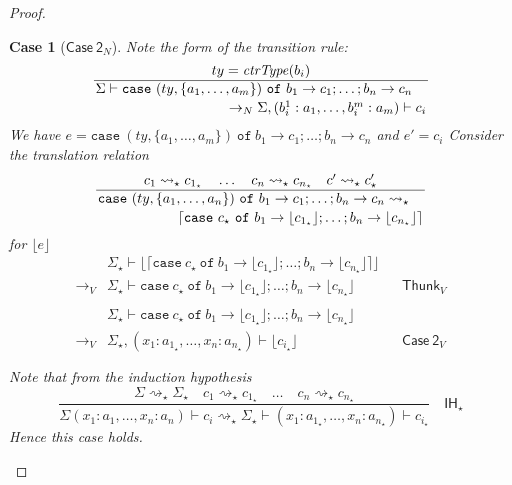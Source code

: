 \documentclass[float=false, crop=false]{standalone}
\newtheorem{case}{Case}
\numberwithin{subcase}{case}
\newcommand{\tlang}{\star}
\newcommand{\thunk}[1]{\lceil #1 \rceil}
\newcommand{\unwrap}[1]{\lfloor #1 \rfloor}
\newcommand{\tcbn}{\rightarrow_N}
\newcommand{\tcbv}{\rightarrow_V}
\newcommand{\tlthunk}{\rightsquigarrow_\tlang}
\begin{document}
\begin{proof}
\begin{case}[$\mathsf{Case\ 2}_N$]
  Note the form of the transition rule:
  \[ \dfrac{ty = \mathit{ctrType}(b_i)}{\splitdfrac{\Sigma \vdash 
  \mathtt{case}\ (ty,\{a_1,\dotsc,a_m\}) \ \mathtt{of}\ b_1 \rightarrow c_1; \dots; b_n \rightarrow c_n}
  {\tcbn \Sigma,(b_i^1:a_1,\dotsc,b_i^m:a_m) \vdash c_i}} \]
  We have $e = 
  \mathtt{case}\ (ty,\{a_1,\dotsc,a_m\}) \ \mathtt{of}\ b_1 \rightarrow c_1;
  \dots; b_n \rightarrow c_n$ and
  $e' = c_i$
  Consider the translation relation
  \[ \dfrac{c_1  \tlthunk c_{1_\tlang} \quad \dots \quad c_n \tlthunk c_{n_\tlang} 
      \quad c' \tlthunk c'_\tlang}
  {\splitdfrac{\mathtt{case}\ (ty,\{a_1,\dotsc,a_n\})\ \mathtt{of}\ 
      b_1 \rightarrow c_1; \dots; b_n \rightarrow c_n \tlthunk}
  {\thunk{\mathtt{case}\ c_\tlang\ \mathtt{of}\ b_1 \rightarrow \unwrap{c_{1_\tlang}}; 
      \dots; b_n \rightarrow \unwrap{c_{n_\tlang}}}}} \]
  for $\unwrap{e}$
  \begin{align*} 
  &\Sigma_\tlang \vdash \unwrap{\thunk{\mathtt{case}\ c_\tlang\ 
      \mathtt{of}\ b_1 \rightarrow \unwrap{c_{1_\tlang}}; 
      \dots; b_n \rightarrow \unwrap{c_{n_\tlang}}}}\\ \tcbv 
  &\Sigma_\tlang \vdash
  \mathtt{case}\ c_\tlang\ \mathtt{of}\ b_1 \rightarrow \unwrap{c_{1_\tlang}};  
      \dots; b_n \rightarrow \unwrap{c_{n_\tlang}} && \mathsf{Thunk}_V\\ \\
 & \Sigma_\tlang \vdash  \mathtt{case}\ c_\tlang\ \mathtt{of}\ b_1 \rightarrow \unwrap{c_{1_\tlang}};  
      \dots; b_n \rightarrow \unwrap{c_{n_\tlang}}\\ \tcbv
      &\Sigma_\tlang,(x_1:a_{1_\tlang},\dotsc,x_n:a_{n_\tlang}) \vdash \unwrap{c_{i_\tlang}}
      &&\mathsf{Case\ 2}_V\\ \\
\end{align*}
  Note that from the induction hypothesis
  \[ \frac{\Sigma \tlthunk \Sigma_\tlang \quad c_1 \tlthunk c_{1_\tlang} \quad \dots \quad
    c_n \tlthunk c_{n_\tlang}}{\Sigma (x_1:a_1,\dotsc,x_n:a_n) \vdash c_i \tlthunk \Sigma_\tlang \vdash 
    (x_1:a_{1_\tlang},\dotsc,x_n:a_{n_\tlang}) \vdash c_{i_\tlang}} \quad 
  \mathsf{IH}_\tlang\]
Hence this case holds.
\end{case}

\end{proof}
\end{document}
